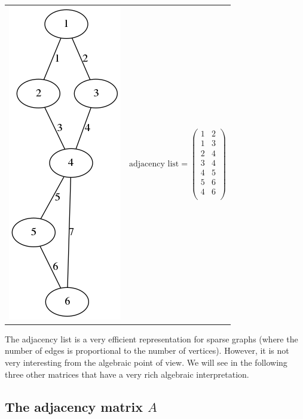 \begin{tabular}{ll}
\includegraphics{graph2.png} &
\vbox{$$
	\textrm{adjacency list} =
	\begin{pmatrix}
		1 & 2 \\
		1 & 3 \\
		2 & 4 \\
		3 & 4 \\
		4 & 5 \\
		5 & 6 \\
		4 & 6 \\
	\end{pmatrix}
$$}
\end{tabular}


The adjacency list is a very efficient representation for sparse graphs (where
the number of edges is proportional to the number of vertices).
However, it is not very interesting from the algebraic point of view.
We will see in the following three other matrices that have a very rich
algebraic interpretation.


\subsection{The adjacency matrix $A$}


